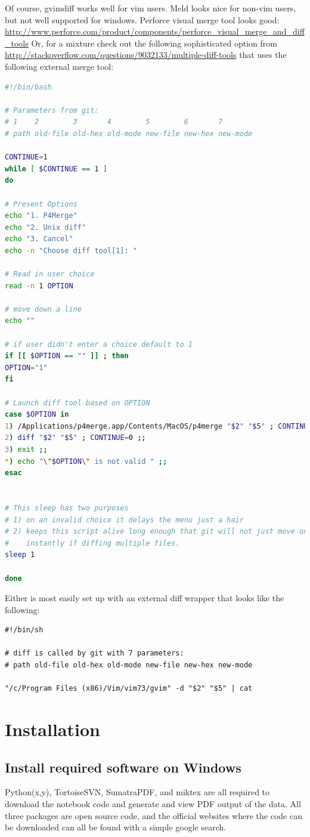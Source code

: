 Of course, gvimdiff works well for vim users.
Meld looks nice for non-vim users, but not well supported for windows.
Perforce visual merge tool looks good:
\url{http://www.perforce.com/product/components/perforce_visual_merge_and_diff_tools}
Or, for a mixture check out the following sophisticated option from
\url{http://stackoverflow.com/questions/9032133/multiple-diff-tools}
that uses the following external merge tool:
\begin{lstlisting}[mathescape=false,language=bash]
#!/bin/bash

# Parameters from git:
# 1    2        3       4        5        6       7
# path old-file old-hex old-mode new-file new-hex new-mode

CONTINUE=1
while [ $CONTINUE == 1 ]
do

# Present Options
echo "1. P4Merge"
echo "2. Unix diff"
echo "3. Cancel"
echo -n "Choose diff tool[1]: "

# Read in user choice
read -n 1 OPTION

# move down a line
echo ""

# if user didn't enter a choice default to 1
if [[ $OPTION == "" ]] ; then
OPTION="1"
fi

# Launch diff tool based on OPTION
case $OPTION in
1) /Applications/p4merge.app/Contents/MacOS/p4merge "$2" "$5" ; CONTINUE=0 ;;
2) diff "$2" "$5" ; CONTINUE=0 ;;
3) exit ;;
*) echo "\"$OPTION\" is not valid " ;;
esac


# This sleep has two purposes
# 1) on an invalid choice it delays the menu just a hair
# 2) keeps this script alive long enough that git will not just move onto the next file
#    instantly if diffing multiple files.
sleep 1

done
\end{lstlisting}

Either is most easily set up with an external diff
    wrapper that looks like the following:
\begin{verbatim}
#!/bin/sh

# diff is called by git with 7 parameters:
# path old-file old-hex old-mode new-file new-hex new-mode

"/c/Program Files (x86)/Vim/vim73/gvim" -d "$2" "$5" | cat
\end{verbatim}
\section{Installation}
\subsection{Install required software on Windows}
Python(x,y), TortoiseSVN, SumatraPDF, and miktex are all required
    to download the notebook code and generate and view PDF output
    of the data.
All three packages are open source code,
    and
    the official websites where the code can be downloaded can all be found
    with a simple google search.
